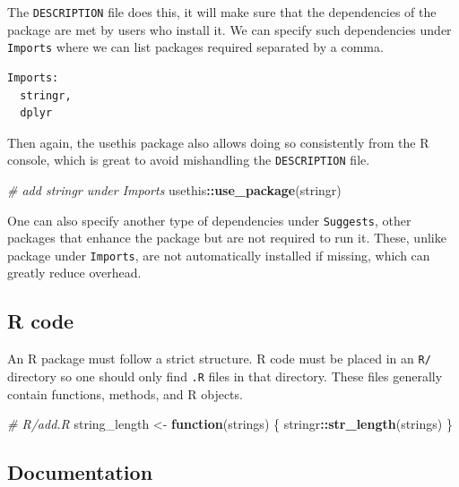 \documentclass[
]{krantz}
\makeatletter
\newenvironment{Shaded}{\begin{snugshade}}{\end{snugshade}}
\newcommand{\CommentTok}[1]{\textcolor[rgb]{0.37,0.37,0.37}{\textit{#1}}}
\newcommand{\ControlFlowTok}[1]{\textcolor[rgb]{0.27,0.27,0.27}{\textbf{#1}}}
\newcommand{\KeywordTok}[1]{\textcolor[rgb]{0.27,0.27,0.27}{\textbf{#1}}}
\newcommand{\NormalTok}[1]{#1}
\newcommand{\OperatorTok}[1]{\textcolor[rgb]{0.43,0.43,0.43}{\textbf{#1}}}
\newcommand{\StringTok}[1]{\textcolor[rgb]{0.5,0.5,0.5}{#1}}
\newenvironment{kframe}{%
\medskip{}
\setlength{\fboxsep}{.8em}
 \def\at@end@of@kframe{}%
 \ifinner\ifhmode%
  \def\at@end@of@kframe{\end{minipage}}%
  \begin{minipage}{\columnwidth}%
 \fi\fi%
 \def\FrameCommand##1{\hskip\@totalleftmargin \hskip-\fboxsep
 \colorbox{shadecolor}{##1}\hskip-\fboxsep
     \hskip-\linewidth \hskip-\@totalleftmargin \hskip\columnwidth}%
 \MakeFramed {\advance\hsize-\width
   \@totalleftmargin\z@ \linewidth\hsize
   \@setminipage}}%
 {\par\unskip\endMakeFramed%
 \at@end@of@kframe}
\renewenvironment{Shaded}{\begin{kframe}}{\end{kframe}}
\makeatother
\begin{document}
The \texttt{DESCRIPTION} file does this, it will make sure that the dependencies of the package are met by users who install it. We can specify such dependencies under \texttt{Imports} where we can list packages required separated by a comma.

\begin{verbatim}
Imports:
  stringr,
  dplyr
\end{verbatim}

Then again, the usethis package also allows doing so consistently from the R console, which is great to avoid mishandling the \texttt{DESCRIPTION} file.

\begin{Shaded}
\begin{Highlighting}[]
\CommentTok{\# add stringr under Imports}
\NormalTok{usethis}\OperatorTok{::}\KeywordTok{use\_package}\NormalTok{(}\StringTok{\textquotesingle{}stringr\textquotesingle{}}\NormalTok{)}
\end{Highlighting}
\end{Shaded}

One can also specify another type of dependencies under \texttt{Suggests}, other packages that enhance the package but are not required to run it. These, unlike package under \texttt{Imports}, are not automatically installed if missing, which can greatly reduce overhead.

\hypertarget{basics-r-code}{%
\subsection{R code}\label{basics-r-code}}

An R package must follow a strict structure. R code must be placed in an \texttt{R/} directory so one should only find \texttt{.R} files in that directory. These files generally contain functions, methods, and R objects.

\begin{Shaded}
\begin{Highlighting}[]
\CommentTok{\# R/add.R}
\NormalTok{string\_length <{-}}\StringTok{ }\ControlFlowTok{function}\NormalTok{(strings) \{}
\NormalTok{  stringr}\OperatorTok{::}\KeywordTok{str\_length}\NormalTok{(strings)}
\NormalTok{\}}
\end{Highlighting}
\end{Shaded}

\hypertarget{basics-documentation}{%
\subsection{Documentation}\label{basics-documentation}}
\end{document}
